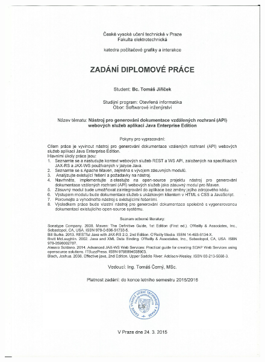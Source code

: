 \documentclass[11pt,twoside,a4paper]{book}
\begin{document}
{
 \cleardoublepage \thispagestyle{empty}
\begin{figure}[h]
\begin{center}
\includegraphics[width=17cm]{figures/zadani.pdf}
\label{fig:logo}
\end{center}
\end{figure}
\newpage
}
\end{document}
